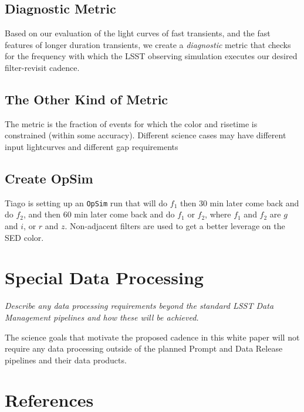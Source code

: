 \documentclass[11pt]{article}
\begin{document}
\subsection{Diagnostic Metric}

Based on our evaluation of the light curves of fast transients, and the fast features of longer duration transients, we create a {\it diagnostic} metric that checks for the frequency with which the LSST observing simulation executes our desired filter-revisit cadence.

\subsection{The Other Kind of Metric}

The metric is the fraction of events for which the color and risetime is constrained (within some accuracy). Different science cases may have different input lightcurves and different gap requirements


\subsection{Create OpSim}

Tiago is setting up an {\tt OpSim} run that will do $f_1$ then 30 min later come back and do $f_2$, and then 60 min later come back and do $f_1$ or $f_2$, where $f_1$ and $f_2$ are $g$ and $i$, or $r$ and $z$. Non-adjacent filters are used to get a better leverage on the SED color.

\vspace{.6in}

\clearpage
\section{Special Data Processing}
\begin{footnotesize}
{\it Describe any data processing requirements beyond the standard LSST Data Management pipelines and how these will be achieved.}
\end{footnotesize}

The science goals that motivate the proposed cadence in this white paper will not require any data processing outside of the planned Prompt and Data Release pipelines and their data products. 

\section{References}



\end{document}
